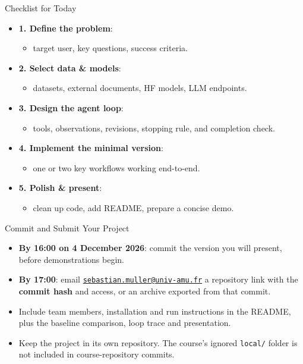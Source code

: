 \documentclass[aspectratio=169]{beamer}
\begin{document}
\begin{frame}{Checklist for Today}
  \begin{itemize}
    \item \textbf{1. Define the problem}:
      \begin{itemize}
        \item target user, key questions, success criteria.
      \end{itemize}
    \item \textbf{2. Select data \& models}:
      \begin{itemize}
        \item datasets, external documents, HF models, LLM endpoints.
      \end{itemize}
    \item \textbf{3. Design the agent loop}:
      \begin{itemize}
        \item tools, observations, revisions, stopping rule, and completion check.
      \end{itemize}
    \item \textbf{4. Implement the minimal version}:
      \begin{itemize}
        \item one or two key workflows working end-to-end.
      \end{itemize}
    \item \textbf{5. Polish \& present}:
      \begin{itemize}
        \item clean up code, add README, prepare a concise demo.
      \end{itemize}
  \end{itemize}
\end{frame}

\begin{frame}{Commit and Submit Your Project}
  \begin{itemize}
    \item \textbf{By 16:00 on 4 December 2026}: commit the version you will present, before demonstrations begin.
    \item \textbf{By 17:00}: email \href{mailto:sebastian.muller@univ-amu.fr}{\texttt{sebastian.muller@univ-amu.fr}} a repository link with the \textbf{commit hash} and access, or an archive exported from that commit.
    \item Include team members, installation and run instructions in the README, plus the baseline comparison, loop trace and presentation.
    \item Keep the project in its own repository. The course's ignored \texttt{local/} folder is not included in course-repository commits.
  \end{itemize}
\end{frame}
\end{document}
